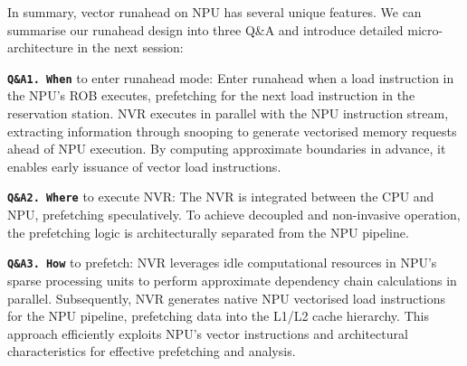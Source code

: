 
In summary, vector runahead on NPU has several unique features. We can summarise our runahead design into three Q\&A and introduce detailed micro-architecture in the next session: 



\noindent \textbf{\texttt{Q\&A1. When}} to enter runahead mode: Enter runahead when a load instruction in the NPU's ROB executes, prefetching for the next load instruction in the reservation station. NVR executes in parallel with the NPU instruction stream, extracting information through snooping to generate vectorised memory requests ahead of NPU execution. By computing approximate boundaries in advance, it enables early issuance of vector load instructions.


\noindent \textbf{\texttt{Q\&A2. Where}} to execute NVR: 
The NVR is integrated between the CPU and NPU, prefetching speculatively. 
To achieve decoupled and non-invasive operation, the prefetching logic is architecturally separated from the NPU pipeline.

\noindent \textbf{\texttt{Q\&A3. How}} to prefetch: 
NVR leverages idle computational resources in NPU's sparse processing units to perform approximate dependency chain calculations in parallel. Subsequently, NVR generates native NPU vectorised load instructions for the NPU pipeline, prefetching data into the L1/L2 cache hierarchy. This approach efficiently exploits NPU's vector instructions and architectural characteristics for effective prefetching and analysis.

